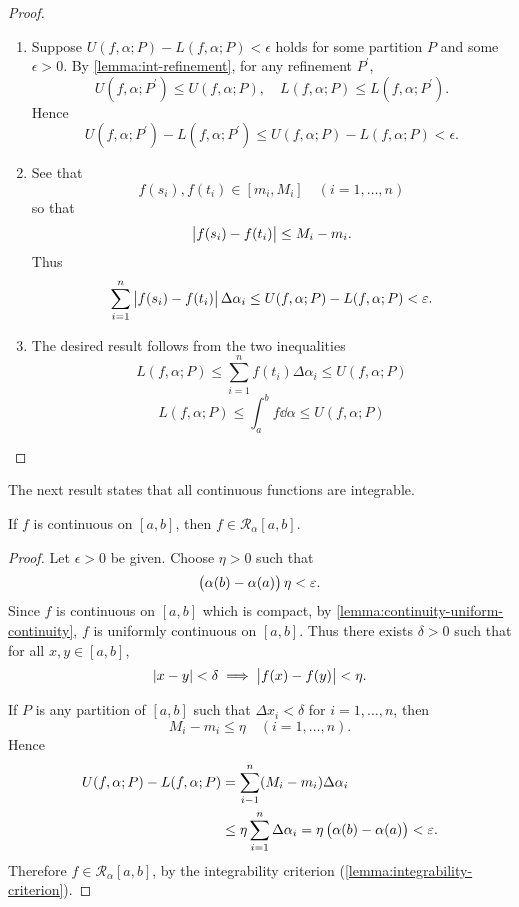 \begin{proof} \
\begin{enumerate}[label=(\roman*)]
\item Suppose $U(f,\alpha;P)-L(f,\alpha;P)<\epsilon$ holds for some partition $P$ and some $\epsilon>0$. By \cref{lemma:int-refinement}, for any refinement $P^\prime$,
\[U(f,\alpha;P^\prime)\le U(f,\alpha;P),\quad L(f,\alpha;P)\le L(f,\alpha;P^\prime).\]
Hence
\[U(f,\alpha;P^\prime)-L(f,\alpha;P^\prime)\le U(f,\alpha;P)-L(f,\alpha;P)<\epsilon.\]

\item See that
\[f(s_i),f(t_i)\in[m_i,M_i]\quad(i=1,\dots,n)\]
so that
\[\left|f(s_i)-f(t_i)\right|\le M_i-m_i.\]
Thus
\[\sum_{i=1}^{n}\left|f(s_i)-f(t_i)\right|\Delta\alpha_i\le U(f,\alpha;P)-L(f,\alpha;P)<\varepsilon.\]

\item The desired result follows from the two inequalities
\[L(f,\alpha;P)\le\sum_{i=1}^{n}f(t_i)\Delta\alpha_i\le U(f,\alpha;P)\]
\[L(f,\alpha;P)\le\int_{a}^{b}f\dd{\alpha}\le U(f,\alpha;P)\]
\end{enumerate}
\end{proof}

The next result states that all continuous functions are integrable.

\begin{proposition}
If $f$ is continuous on $[a,b]$, then $f\in \mathcal{R}_\alpha[a,b]$.
\end{proposition}

\begin{proof}
Let $\epsilon>0$ be given. Choose $\eta>0$ such that
\[\left(\alpha(b)-\alpha(a)\right)\eta<\varepsilon.\]
Since $f$ is continuous on $[a,b]$ which is compact, by \cref{lemma:continuity-uniform-continuity}, $f$ is uniformly continuous on $[a,b]$. Thus there exists $\delta>0$ such that for all $x,y\in[a,b]$,
\[|x-y|<\delta\implies\left|f(x)-f(y)\right|<\eta.\]

If $P$ is any partition of $[a,b]$ such that $\Delta x_i<\delta$ for $i=1,\dots,n$, then
\[M_i-m_i\le\eta\quad(i=1,\dots,n).\]
Hence
\begin{align*}
U(f,\alpha;P)-L(f,\alpha;P)
&=\sum_{i-1}^{n}(M_i-m_i)\Delta\alpha_i\\
&\le\eta\sum_{i=1}^{n}\Delta\alpha_i=\eta\left(\alpha(b)-\alpha(a)\right)<\varepsilon.
\end{align*}
Therefore $f\in\mathcal{R}_\alpha[a,b]$, by the integrability criterion (\cref{lemma:integrability-criterion}).
\end{proof}

